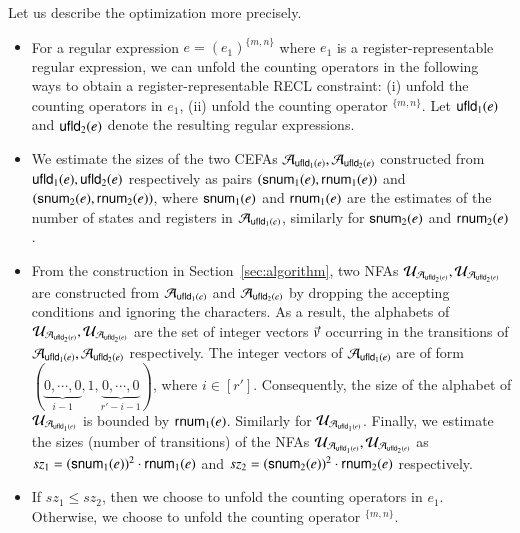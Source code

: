 Let us describe the optimization more precisely. 
\begin{itemize}
\item For a regular expression $e = (e_1)^{\{m,n\}}$ where $e_1$ is a register-representable regular expression, we can unfold the counting operators in the following ways to obtain a register-representable RECL constraint: (i) unfold the counting operators in $e_1$, (ii) unfold the counting operator $^{\{m,n\}}$. 
%
Let ${\sf ufld}_1(e)$ and ${\sf ufld}_2(e)$ denote the resulting regular expressions. 

\item We estimate the sizes of the two CEFAs $\mathcal{A}_{{\sf ufld}_1(e)}, \mathcal{A}_{{\sf ufld}_2(e)}$ constructed from ${\sf ufld}_1(e), {\sf ufld}_2(e)$ respectively as pairs $({\sf snum}_1(e), {\sf rnum}_1(e))$ and $({\sf snum}_2(e), {\sf rnum}_2(e))$, where ${\sf snum}_1(e)$ and ${\sf rnum}_1(e)$ are the estimates of the number of states and registers in $\mathcal{A}_{{\sf ufld}_1(e)}$, similarly for ${\sf snum}_2(e)$ and ${\sf rnum}_2(e)$. 
%
\item From the construction in Section~\ref{sec:algorithm}, 
two NFAs $\mathcal{U}_{\mathcal{A}_{{\sf ufld}_2(e)}}, \mathcal{U}_{\mathcal{A}_{{\sf ufld}_2(e)}}$ are constructed from $\mathcal{A}_{{\sf ufld}_1(e)}$ and $\mathcal{A}_{{\sf ufld}_2(e)}$ by dropping the accepting conditions and ignoring the characters. As a result, the alphabets of $\mathcal{U}_{\mathcal{A}_{{\sf ufld}_2(e)}}, \mathcal{U}_{\mathcal{A}_{{\sf ufld}_2(e)}}$ are the set of integer vectors  $\vec{v}$ occurring in the transitions of $\mathcal{A}_{{\sf ufld}_1(e)}, \mathcal{A}_{{\sf ufld}_2(e)}$ respectively. The integer vectors of  $\mathcal{A}_{{\sf ufld}_1(e)}$ are of form $(\underbrace{0, \cdots, 0}_{i-1}, 1, \underbrace{0, \cdots, 0}_{r'-i-1})$, where $i \in [r']$. Consequently, the size of the alphabet of $\mathcal{U}_{\mathcal{A}_{{\sf ufld}_1(e)}}$ is bounded by ${\sf rnum}_1(e)$. Similarly for $\mathcal{U}_{\mathcal{A}_{{\sf ufld}_1(e)}}$. 
Finally, we estimate the sizes (number of transitions) of the NFAs $\mathcal{U}_{\mathcal{A}_{{\sf ufld}_1(e)}}, \mathcal{U}_{\mathcal{A}_{{\sf ufld}_2(e)}}$ as $sz_1 = ({\sf snum}_1(e))^2 \cdot {\sf rnum}_1(e)$ and $sz_2 = ({\sf snum}_2(e))^2 \cdot {\sf rnum}_2(e)$ respectively.
%
\item If $sz_1 \le sz_2$, then we choose to unfold the counting operators in $e_1$. Otherwise, we choose to unfold the counting operator $^{\{m,n\}}$. 
\end{itemize}


